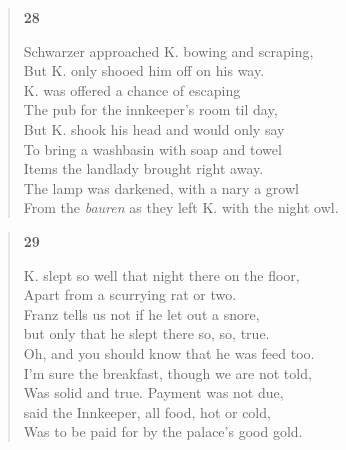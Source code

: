 \documentclass{article}
\begin{document}
\newpage

\begin{verse}
  \begin{center}
    \textbf{28} \\
  \end{center}
  Schwarzer approached K. bowing and scraping, \\
  But K. only shooed him off on his way. \\
  K. was offered a chance of escaping \\
  The pub for the innkeeper's room til day, \\
  But K. shook his head and would only say \\
  To bring a washbasin with soap and towel \\
  Items the landlady brought right away. \\
  The lamp was darkened, with a nary a growl \\
  From the \textit{bauren} as they left K. with the night owl.
\end{verse}

\begin{verse}
  \begin{center}
    \textbf{29} \\
  \end{center}
  K. slept so well that night there on the floor, \\
  Apart from a scurrying rat or two.\\
  Franz tells us not if he let out a snore, \\
  but only that he slept there so, so, true. \\
  Oh, and you should know that he was feed too. \\
  I'm sure the breakfast, though we are not told, \\
  Was solid and true. Payment was not due, \\
  said the Innkeeper, all food, hot or cold, \\
  Was to be paid for by the palace's good gold.
\end{verse}
\end{document}
